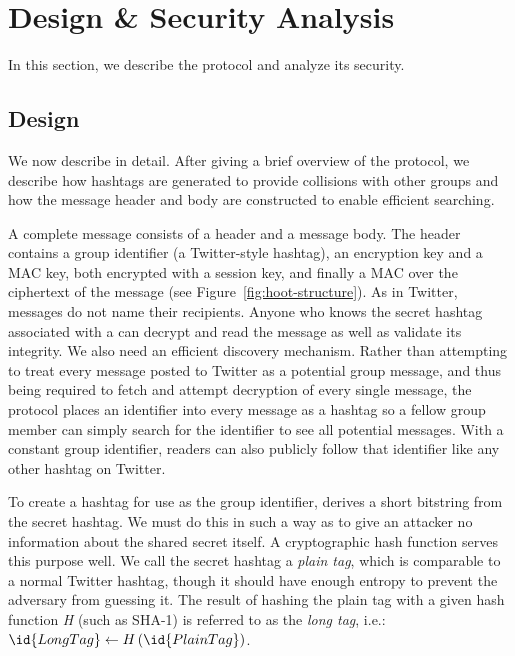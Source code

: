\section{\hoot Design \& Security Analysis}
\label{sec:design-sec}

In this section, we describe the \hoot protocol and analyze its security.

\subsection{Design}
\label{sec:design}

We now describe \hoot in detail. After giving a brief overview of the
\hoot  protocol, we describe how hashtags are generated to provide
collisions with other groups and how the message header and body are
constructed to enable efficient searching.

 A complete \hoot message consists of a 
header and a message body. The header contains a group identifier
(a Twitter-style hashtag), an encryption key and a MAC key, both
encrypted with a session key, and finally a MAC
over the ciphertext of the message (see
Figure~\ref{fig:hoot-structure}). As in
Twitter, messages do not name their recipients. Anyone who knows the
secret hashtag associated with a \hoot can decrypt and read the message
as well as validate its integrity.
We also need an efficient discovery mechanism.
Rather than attempting to treat every message
posted to Twitter as a potential group message, and thus being
required to fetch and attempt decryption of every single message,
the \hoot protocol places an identifier into every \hoot message
as a hashtag so a fellow group member can simply search for the
identifier to see all potential messages. With a constant group
identifier, readers can also publicly follow that identifier like any
other hashtag on Twitter.

 To create a hashtag for use as the group
identifier, \hoot derives a short bitstring from the secret hashtag. We
must do this in such a way as to give an attacker no information about
the shared secret itself. A cryptographic hash function serves this
purpose well.
We call the secret hashtag a \textit{plain tag}, which is comparable to
a normal Twitter hashtag, though it should have enough entropy to
prevent the adversary from guessing it. The result of hashing the plain
tag with a given hash function \textit{H} (such as SHA-1) is referred to
as the \textit{long tag}, i.e.:
%
$\id{LongTag} \leftarrow H\left(\id{PlainTag}\right)$.

